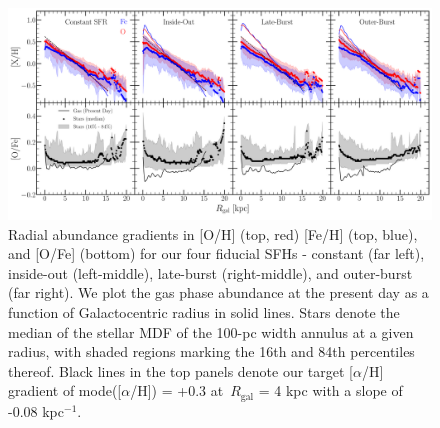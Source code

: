 \documentclass[fleqn, usenatbib]{mnras}
\begin{document}
\begin{figure} 
\centering 
\includegraphics[scale = 0.32]{metallicity_gradient.pdf} 
\caption{Radial abundance gradients in [O/H] (top, red) [Fe/H] (top, blue), 
and [O/Fe] (bottom) for our four fiducial SFHs - constant (far left), 
inside-out (left-middle), late-burst (right-middle), and outer-burst (far 
right). We plot the gas phase abundance at the present day as a function of 
Galactocentric radius in solid lines. Stars denote the median of the stellar 
MDF of the 100-pc width annulus at a given radius, with shaded regions marking 
the 16th and 84th percentiles thereof. Black lines in the top panels denote our 
target [$\alpha$/H] gradient of mode([$\alpha$/H]) = +0.3 at~$R_\text{gal}$ = 
4 kpc with a slope of -0.08 kpc$^{-1}$. 
} 
\label{fig:metallicity_gradient} 
\end{figure} 
\end{document}
